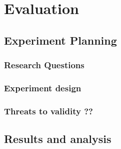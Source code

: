 \chapter{Evaluation}

\section{Experiment Planning}

\subsection{Research Questions}

\subsection{Experiment design}

\subsection{Threats to validity ??}
\section{Results and analysis}






